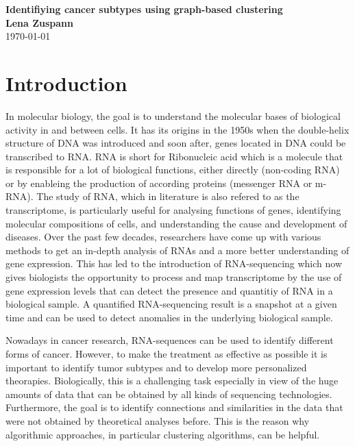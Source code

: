 \documentclass[paper=a4,fontsize=11pt,DIV=8,BCOR=5mm,twoside,pdftex,bibtotocnumbered]{scrreprt}
\theoremstyle{plain}
\begin{document}
\begin{titlepage}
	\begin{center}
		\Huge \textsf{\textbf{Identifiying cancer subtypes using graph-based clustering}}
		\\[1.4cm]
		\Large \textsf{\textbf{Lena Zuspann}}
		\\[1.4cm]
		\today
	\end{center}
\end{titlepage}

\setcounter{page}{1}
\tableofcontents

\chapter{Introduction}\label{ch:intro}
In molecular biology, the goal is to understand the molecular bases of biological activity in and between cells. It has its origins in the 1950s when the double-helix structure of DNA was introduced and soon after, genes located in DNA could be transcribed to RNA. RNA is short for Ribonucleic acid which is a molecule that is responsible for a lot of biological functions, either directly (non-coding RNA) or by enableing the production of according proteins (messenger RNA or m-RNA). The study of RNA, which in literature is also refered to as the transcriptome, is particularly useful for analysing functions of genes, identifying molecular compositions of cells, and understanding the cause and development of diseases. Over the past few decades, researchers have come up with various methods to get an in-depth analysis of RNAs and a more better understanding of gene expression. This has led to the introduction of RNA-sequencing which now gives biologists the opportunity to process and map transcriptome by the use of gene expression levels that can detect the presence and quantitiy of RNA in a biological sample. A quantified RNA-sequencing result is a snapshot at a given time and can be used to detect anomalies in the underlying biological sample. 

Nowadays in cancer research, RNA-sequences can be used to identify different forms of cancer. However, to make the treatment as effective as possible it is important to identify tumor subtypes and to develop more personalized theorapies. Biologically, this is a challenging task especially in view of the huge amounts of data that can be obtained by all kinds of sequencing technologies. Furthermore, the goal is to identify connections and similarities in the data that were not obtained by theoretical analyses before. This is the reason why algorithmic approaches, in particular clustering algorithms, can be helpful. 
\end{document}
